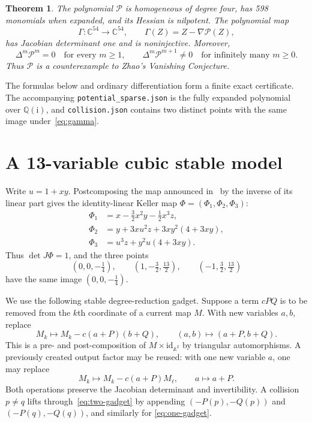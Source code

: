 \documentclass[11pt]{article}
\newtheorem{theorem}{Theorem}
\newcommand{\C}{\mathbb C}
\newcommand{\Q}{\mathbb Q}
\newcommand{\cP}{\mathcal P}
\newcommand{\ii}{\mathrm i}
\begin{document}
\begin{theorem}\label{thm:main}
The polynomial $\cP$ is homogeneous of degree four, has 598 monomials when
expanded, and its Hessian is nilpotent.  The polynomial map
\begin{equation}
  \Gamma:\C^{54}\longrightarrow\C^{54},\qquad
  \Gamma(Z)=Z-\nabla\cP(Z),
  \label{eq:gamma}
\end{equation}
has Jacobian determinant one and is noninjective.  Moreover,
\begin{equation}
  \Delta^m\cP^m=0\quad\text{for every }m\geq1,
  \qquad
  \Delta^m\cP^{m+1}\neq0\quad\text{for infinitely many }m\geq0.
  \label{eq:vc-counterexample}
\end{equation}
Thus $\cP$ is a counterexample to Zhao's Vanishing Conjecture.
\end{theorem}

The formulas below and ordinary differentiation form a finite exact
certificate.  The accompanying \texttt{potential\_sparse.json} is the fully
expanded polynomial over $\Q(\ii)$, and \texttt{collision.json} contains two
distinct points with the same image under~\eqref{eq:gamma}.

\section{A 13-variable cubic stable model}

Write $u=1+xy$.  Postcomposing the map announced in~\cite{alpoge} by the
inverse of its linear part gives the identity-linear Keller map
$\Phi=(\Phi_1,\Phi_2,\Phi_3)$:
\begin{align}
\Phi_1&=x-\frac32x^2y-\frac12x^3z,\nonumber\\
\Phi_2&=y+3xu^2z+3xy^2(4+3xy),\label{eq:phi}\\
\Phi_3&=u^3z+y^2u(4+3xy).\nonumber
\end{align}
Thus $\det J\Phi=1$, and the three points
\begin{equation}
(0,0,-\tfrac14),\qquad(1,-\tfrac32,\tfrac{13}2),\qquad
(-1,\tfrac32,\tfrac{13}2)
\label{eq:three-points}
\end{equation}
have the same image $(0,0,-\tfrac14)$.

We use the following stable degree-reduction gadget.  Suppose a term $cPQ$ is
to be removed from the $k$th coordinate of a current map $M$.  With new
variables $a,b$, replace
\begin{equation}
 M_k\longmapsto M_k-c(a+P)(b+Q),\qquad
 (a,b)\longmapsto(a+P,b+Q).
 \label{eq:two-gadget}
\end{equation}
This is a pre- and post-composition of $M\times\mathrm{id}_{\mathbb A^2}$ by
triangular automorphisms.  A previously created output factor may be reused:
with one new variable $a$, one may replace
\begin{equation}
 M_k\longmapsto M_k-c(a+P)M_\ell,\qquad a\longmapsto a+P.
 \label{eq:one-gadget}
\end{equation}
Both operations preserve the Jacobian determinant and invertibility.  A
collision $p\ne q$ lifts through~\eqref{eq:two-gadget} by appending
$(-P(p),-Q(p))$ and $(-P(q),-Q(q))$, and similarly for
\eqref{eq:one-gadget}.
\end{document}
